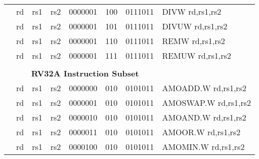 \begin{table}[p]
\begin{small}
\begin{center}
\begin{tabular}{rccccccccccl}
&
\multicolumn{1}{|c|}{rd} &
\multicolumn{1}{c|}{rs1} &
\multicolumn{1}{c|}{rs2} &
\multicolumn{4}{c|}{0000001} &
\multicolumn{2}{c|}{100} &
\multicolumn{1}{c|}{0111011} & DIVW rd,rs1,rs2 \\
\cline{2-11}
  

&
\multicolumn{1}{|c|}{rd} &
\multicolumn{1}{c|}{rs1} &
\multicolumn{1}{c|}{rs2} &
\multicolumn{4}{c|}{0000001} &
\multicolumn{2}{c|}{101} &
\multicolumn{1}{c|}{0111011} & DIVUW rd,rs1,rs2 \\
\cline{2-11}
  

&
\multicolumn{1}{|c|}{rd} &
\multicolumn{1}{c|}{rs1} &
\multicolumn{1}{c|}{rs2} &
\multicolumn{4}{c|}{0000001} &
\multicolumn{2}{c|}{110} &
\multicolumn{1}{c|}{0111011} & REMW rd,rs1,rs2 \\
\cline{2-11}
  

&
\multicolumn{1}{|c|}{rd} &
\multicolumn{1}{c|}{rs1} &
\multicolumn{1}{c|}{rs2} &
\multicolumn{4}{c|}{0000001} &
\multicolumn{2}{c|}{111} &
\multicolumn{1}{c|}{0111011} & REMUW rd,rs1,rs2 \\
\cline{2-11}
  

&
\multicolumn{10}{c}{} & \\
&
\multicolumn{10}{c}{\bf RV32A Instruction Subset} & \\
\cline{2-11}
  

&
\multicolumn{1}{|c|}{rd} &
\multicolumn{1}{c|}{rs1} &
\multicolumn{1}{c|}{rs2} &
\multicolumn{4}{c|}{0000000} &
\multicolumn{2}{c|}{010} &
\multicolumn{1}{c|}{0101011} & AMOADD.W rd,rs1,rs2 \\
\cline{2-11}
  

&
\multicolumn{1}{|c|}{rd} &
\multicolumn{1}{c|}{rs1} &
\multicolumn{1}{c|}{rs2} &
\multicolumn{4}{c|}{0000001} &
\multicolumn{2}{c|}{010} &
\multicolumn{1}{c|}{0101011} & AMOSWAP.W rd,rs1,rs2 \\
\cline{2-11}
  

&
\multicolumn{1}{|c|}{rd} &
\multicolumn{1}{c|}{rs1} &
\multicolumn{1}{c|}{rs2} &
\multicolumn{4}{c|}{0000010} &
\multicolumn{2}{c|}{010} &
\multicolumn{1}{c|}{0101011} & AMOAND.W rd,rs1,rs2 \\
\cline{2-11}
  

&
\multicolumn{1}{|c|}{rd} &
\multicolumn{1}{c|}{rs1} &
\multicolumn{1}{c|}{rs2} &
\multicolumn{4}{c|}{0000011} &
\multicolumn{2}{c|}{010} &
\multicolumn{1}{c|}{0101011} & AMOOR.W rd,rs1,rs2 \\
\cline{2-11}
  

&
\multicolumn{1}{|c|}{rd} &
\multicolumn{1}{c|}{rs1} &
\multicolumn{1}{c|}{rs2} &
\multicolumn{4}{c|}{0000100} &
\multicolumn{2}{c|}{010} &
\multicolumn{1}{c|}{0101011} & AMOMIN.W rd,rs1,rs2 \\
\cline{2-11}
  


\end{tabular}
\end{center}
\end{small}
\end{table}
